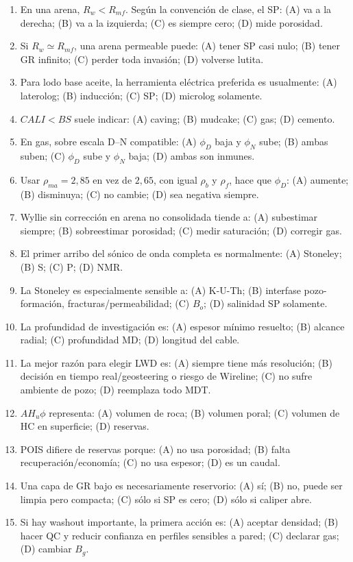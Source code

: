 \documentclass[10.5pt,a4paper]{article}
\begin{document}
\begin{enumerate}
\item En una arena, $R_w<R_{mf}$. Seg\'un la convenci\'on de clase, el SP: (A) va a la derecha; (B) va a la izquierda; (C) es siempre cero; (D) mide porosidad.
\item Si $R_w\simeq R_{mf}$, una arena permeable puede: (A) tener SP casi nulo; (B) tener GR infinito; (C) perder toda invasi\'on; (D) volverse lutita.
\item Para lodo base aceite, la herramienta el\'ectrica preferida es usualmente: (A) laterolog; (B) inducci\'on; (C) SP; (D) microlog solamente.
\item $CALI<BS$ suele indicar: (A) caving; (B) mudcake; (C) gas; (D) cemento.
\item En gas, sobre escala D--N compatible: (A) $\phi_D$ baja y $\phi_N$ sube; (B) ambas suben; (C) $\phi_D$ sube y $\phi_N$ baja; (D) ambas son inmunes.
\item Usar $\rho_{ma}=2{,}85$ en vez de $2{,}65$, con igual $\rho_b$ y $\rho_f$, hace que $\phi_D$: (A) aumente; (B) disminuya; (C) no cambie; (D) sea negativa siempre.
\item Wyllie sin correcci\'on en arena no consolidada tiende a: (A) subestimar siempre; (B) sobreestimar porosidad; (C) medir saturaci\'on; (D) corregir gas.
\item El primer arribo del s\'onico de onda completa es normalmente: (A) Stoneley; (B) S; (C) P; (D) NMR.
\item La Stoneley es especialmente sensible a: (A) K-U-Th; (B) interfase pozo-formaci\'on, fracturas/permeabilidad; (C) $B_o$; (D) salinidad SP solamente.
\item La profundidad de investigaci\'on es: (A) espesor m\'inimo resuelto; (B) alcance radial; (C) profundidad MD; (D) longitud del cable.
\item La mejor raz\'on para elegir LWD es: (A) siempre tiene m\'as resoluci\'on; (B) decisi\'on en tiempo real/geosteering o riesgo de Wireline; (C) no sufre ambiente de pozo; (D) reemplaza todo MDT.
\item $AH_u\phi$ representa: (A) volumen de roca; (B) volumen poral; (C) volumen de HC en superficie; (D) reservas.
\item POIS difiere de reservas porque: (A) no usa porosidad; (B) falta recuperaci\'on/econom\'ia; (C) no usa espesor; (D) es un caudal.
\item Una capa de GR bajo es necesariamente reservorio: (A) s\'i; (B) no, puede ser limpia pero compacta; (C) s\'olo si SP es cero; (D) s\'olo si caliper abre.
\item Si hay washout importante, la primera acci\'on es: (A) aceptar densidad; (B) hacer QC y reducir confianza en perfiles sensibles a pared; (C) declarar gas; (D) cambiar $B_g$.
\end{enumerate}
\end{document}
